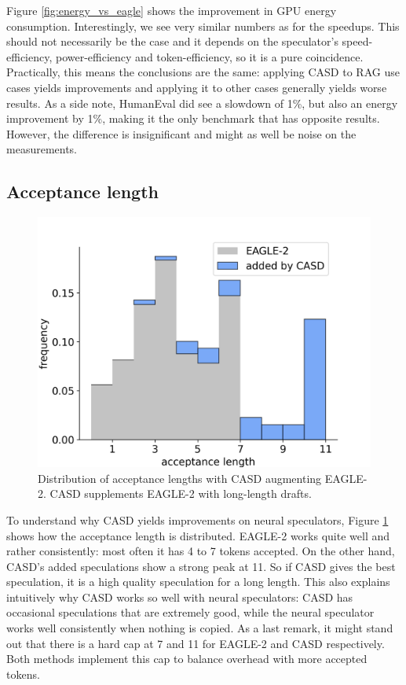 Figure \ref{fig:energy_vs_eagle} shows the improvement in GPU energy consumption. Interestingly, we see very similar numbers as for the speedups. This should not necessarily be the case and it depends on the speculator's speed-efficiency, power-efficiency and token-efficiency, so it is a pure coincidence. Practically, this means the conclusions are the same: applying CASD to RAG use cases yields improvements and applying it to other cases generally yields worse results. As a side note, HumanEval did see a slowdown of 1\%, but also an energy improvement by 1\%, making it the only benchmark that has opposite results. However, the difference is insignificant and might as well be noise on the measurements.

\subsection{Acceptance length}
\begin{figure}[h]
  \centering
  \includegraphics[width=0.7\linewidth]{fig/acceptance_length.png}
  \caption{Distribution of acceptance lengths with CASD augmenting EAGLE-2. CASD supplements EAGLE-2 with long-length drafts.}
  \label{fig:acceptance_length}
\end{figure}

To understand why CASD yields improvements on neural speculators, Figure \ref{fig:acceptance_length} shows how the acceptance length is distributed. EAGLE-2 works quite well and rather consistently: most often it has 4 to 7 tokens accepted. On the other hand, CASD's added speculations show a strong peak at 11. So if CASD gives the best speculation, it is a high quality speculation for a long length. This also explains intuitively why CASD works so well with neural speculators: CASD has occasional speculations that are extremely good, while the neural speculator works well consistently when nothing is copied. As a last remark, it might stand out that there is a hard cap at 7 and 11 for EAGLE-2 and CASD respectively. Both methods implement this cap to balance overhead with more accepted tokens.

